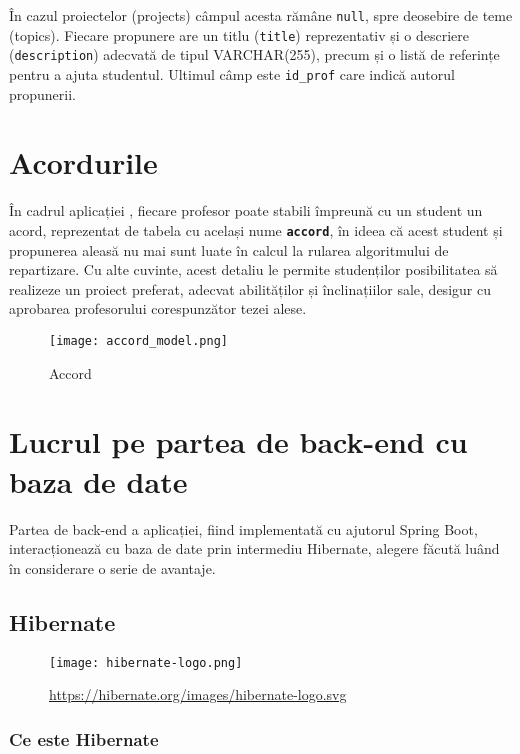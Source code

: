În cazul proiectelor (projects) câmpul acesta rămâne \texttt{null}, spre deosebire de teme (topics). Fiecare propunere are un titlu (\texttt{title}) reprezentativ și o descriere (\texttt{description}) adecvată de tipul VARCHAR(255), precum și o listă de referințe pentru a ajuta studentul. Ultimul câmp este \texttt{id\_prof} care indică autorul propunerii.


\section{Acordurile}

În cadrul aplicației \thesistitle, fiecare profesor poate stabili împreună cu un student un acord, reprezentat de tabela cu același nume \textbf{\texttt{accord}}, în ideea că acest student și propunerea aleasă nu mai sunt luate în calcul la rularea algoritmului de repartizare. Cu alte cuvinte, acest detaliu le permite studenților posibilitatea să realizeze un proiect preferat, adecvat abilităților și înclinațiilor sale, desigur cu aprobarea profesorului corespunzător tezei alese.

\begin{figure}[H]
	\centering
	\texttt{[image: accord\_model.png]}
	\caption{Accord}
\end{figure}

\section{Lucrul pe partea de back-end cu baza de date}

Partea de back-end a aplicației, fiind implementată cu ajutorul Spring Boot, interacționează cu baza de date prin intermediu Hibernate, alegere făcută luând în considerare o serie de avantaje.

\subsection{Hibernate}

\begin{figure}[H]
	\texttt{[image: hibernate-logo.png]}
	\caption{\url{https://hibernate.org/images/hibernate-logo.svg}}
\end{figure}

\subsubsection{Ce este Hibernate}

